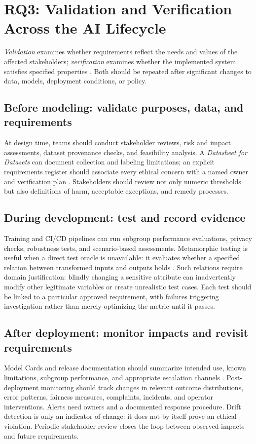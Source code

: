\documentclass[11pt,a4paper]{article}
\begin{document}
\section{RQ3: Validation and Verification Across the AI Lifecycle}
\emph{Validation} examines whether requirements reflect the needs and values of the affected stakeholders; \emph{verification} examines whether the implemented system satisfies specified properties \cite{boehm1984}. Both should be repeated after significant changes to data, models, deployment conditions, or policy.

\subsection{Before modeling: validate purposes, data, and requirements}
At design time, teams should conduct stakeholder reviews, risk and impact assessments, dataset provenance checks, and feasibility analysis. A \emph{Datasheet for Datasets} can document collection and labeling limitations; an explicit requirements register should associate every ethical concern with a named owner and verification plan \cite{gebru2021,reisman2018}. Stakeholders should review not only numeric thresholds but also definitions of harm, acceptable exceptions, and remedy processes.

\subsection{During development: test and record evidence}
Training and CI/CD pipelines can run subgroup performance evaluations, privacy checks, robustness tests, and scenario-based assessments. Metamorphic testing is useful when a direct test oracle is unavailable: it evaluates whether a specified relation between transformed inputs and outputs holds \cite{chen2018}. Such relations require domain justification: blindly changing a sensitive attribute can inadvertently modify other legitimate variables or create unrealistic test cases. Each test should be linked to a particular approved requirement, with failures triggering investigation rather than merely optimizing the metric until it passes.

\subsection{After deployment: monitor impacts and revisit requirements}
Model Cards and release documentation should summarize intended use, known limitations, subgroup performance, and appropriate escalation channels \cite{mitchell2019}. Post-deployment monitoring should track changes in relevant outcome distributions, error patterns, fairness measures, complaints, incidents, and operator interventions. Alerts need owners and a documented response procedure. Drift detection is only an indicator of change: it does not by itself prove an ethical violation. Periodic stakeholder review closes the loop between observed impacts and future requirements.
\end{document}
